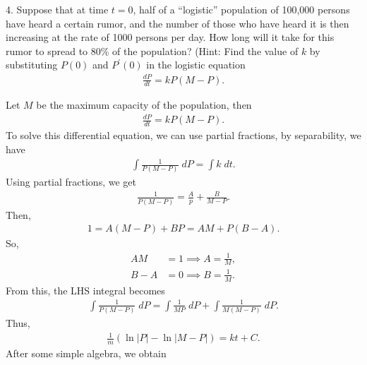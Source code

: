 \documentclass{report}
\begin{document}
    \bigbreak \noindent 
    \begin{mdframed}
        4. Suppose that at time $t = 0$, half of a “logistic” population of 100,000 persons have heard a certain rumor, and the number of those who have heard it is then increasing at the rate of 1000 persons per day. How long will it take for this rumor to spread to 80\% of the population? (Hint: Find the value of $k$ by substituting $P(0)$ and $P^{\prime}(0)$ in the logistic equation 
        \begin{align*}
            \frac{dP}{dt} = kP(M - P)
        .\end{align*}
    \end{mdframed}
    \bigbreak \noindent
    \begin{remark}
                    Let $M$ be the maximum capacity of the population, then
            \begin{align*}
                \frac{dP}{dt} = kP(M-P)
            .\end{align*}
            To solve this differential equation, we can use partial fractions, by separability, we have
            \begin{align*}
                \int \frac{1}{P(M-P)}\; dP = \int k\; dt
            .\end{align*}
            Using partial fractions, we get
            \begin{align*}
                \frac{1}{P(M-P)} = \frac{A}{p} + \frac{B}{M-P}
            .\end{align*}
            Then,
            \begin{align*}
                1 = A(M-P) + BP = AM + P(B-A)
            .\end{align*}
            So,
            \begin{align*}
                AM &= 1 \implies A = \frac{1}{M}, \\
                B-A &= 0 \implies B = \frac{1}{M}
            .\end{align*}
            From this, the LHS integral becomes
            \begin{align*}
                \int \frac{1}{P(M-P)}\; dP = \int \frac{1}{MP}\; dP + \int \frac{1}{M(M-P)}\; dP
            .\end{align*}
            Thus,
            \begin{align*}
                \frac{1}{m}\left(\ln{\left\lvert P \right\rvert} - \ln{\left\lvert M-P \right\rvert}\right) = kt + C
            .\end{align*}
            After some simple algebra, we obtain

\end{remark}
\end{document}
